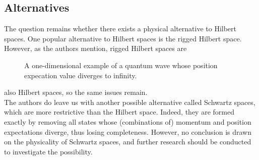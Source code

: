 \documentclass[12pt]{article}
\begin{document}
\begin{multicols}{2}
    \section*{Alternatives}
    The question remains whether there exists a physical alternative to Hilbert spaces. One popular alternative to Hilbert spaces is the rigged Hilbert space\cite{de_la_madrid_role_2005}. However, as the authors mention, rigged Hilbert spaces are
    \begin{figure}[H]
        \centering
        
        \caption{A one-dimensional example of a quantum wave whose position expecation value diverges to infinity.}
        \label{fig:sketch}
    \end{figure}
    also Hilbert spaces, so the same issues remain.\\
    The authors do leave us with another possible alternative called Schwartz spaces\cite{becnel_schwartz_2015}, which are more restrictive than the Hilbert space. Indeed, they are formed exactly by removing all states whose (combinations of) momentum and position expectations diverge, thus losing completeness. However, no conclusion is drawn on the physicality of Schwartz spaces, and further research should be conducted to investigate the possibility.
\end{multicols}
\printbibliography
\end{document}
